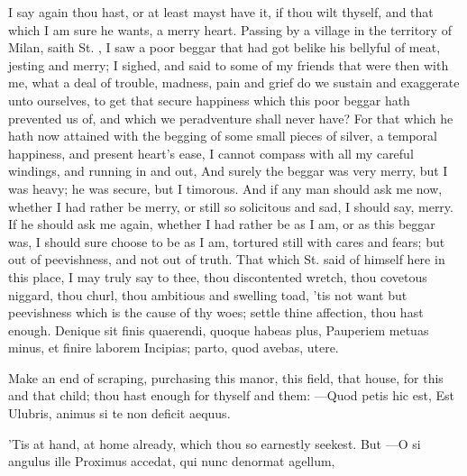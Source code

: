 {I say again thou hast, or at least mayst have it, if thou wilt thyself,
and that which I am sure he wants, a merry heart. Passing by a village
in the territory of Milan, saith St. \Austin{}, I saw a poor beggar
that had got belike his bellyful of meat, jesting and merry; I sighed,
and said to some of my friends that were then with me, what a deal of
trouble, madness, pain and grief do we sustain and exaggerate unto
ourselves, to get that secure happiness which this poor beggar hath
prevented us of, and which we peradventure shall never have? For that
which he hath now attained with the begging of some small pieces of
silver, a temporal happiness, and present heart's ease, I cannot
compass with all my careful windings, and running in and out, And
surely the beggar was very merry, but I was heavy; he was secure, but I
timorous. And if any man should ask me now, whether I had rather be
merry, or still so solicitous and sad, I should say, merry. If he
should ask me again, whether I had rather be as I am, or as this beggar
was, I should sure choose to be as I am, tortured still with cares and
fears; but out of peevishness, and not out of truth. That which St.
\Austin{} said of himself here in this place, I may truly say to thee,
thou discontented wretch, thou covetous niggard, thou churl, thou
ambitious and swelling toad, 'tis not want but peevishness which is the
cause of thy woes; settle thine affection, thou hast enough.
Denique sit finis quaerendi, quoque habeas plus,
Pauperiem metuas minus, et finire laborem
Incipias; parto, quod avebas, utere.

Make an end of scraping, purchasing this manor, this field, that house,
for this and that child; thou hast enough for thyself and them:
---Quod petis hic est,
Est Ulubris, animus si te non deficit aequus.

'Tis at hand, at home already, which thou so earnestly seekest. But
---O si angulus ille
Proximus accedat, qui nunc denormat agellum,

}
